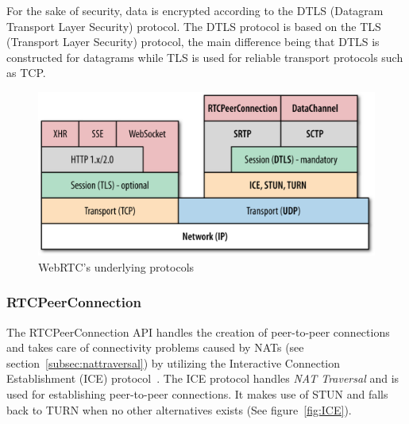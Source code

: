 For the sake of security, data is encrypted according to the DTLS (Datagram Transport Layer Security) protocol. The DTLS protocol is based on the TLS (Transport Layer Security) protocol, the main difference being that DTLS is constructed for datagrams while TLS is used for reliable transport protocols such as TCP.

\begin{figure}[htp]
\centering
\includegraphics[width=\textwidth,height=0.25\paperheight,keepaspectratio
]{figures/webrtc_protocol_stack}
\caption{WebRTC's underlying protocols~\cite{WebRTCProtocolStack:Online}}
\label{fig:WebRTCProtocols}
\end{figure}


\subsubsection{RTCPeerConnection}
\label{subsubsec:rtcpeerconnection}
The RTCPeerConnection API handles the creation of peer-to-peer connections and takes care of connectivity problems caused by NATs (see section~\ref{subsec:nattraversal}) by utilizing the Interactive Connection Establishment (ICE) protocol~\cite{RFC5245:Online}. The ICE protocol handles \emph{NAT Traversal} and is used for establishing peer-to-peer connections. It makes use of STUN and falls back to TURN when no other alternatives exists (See figure~\ref{fig:ICE}).

